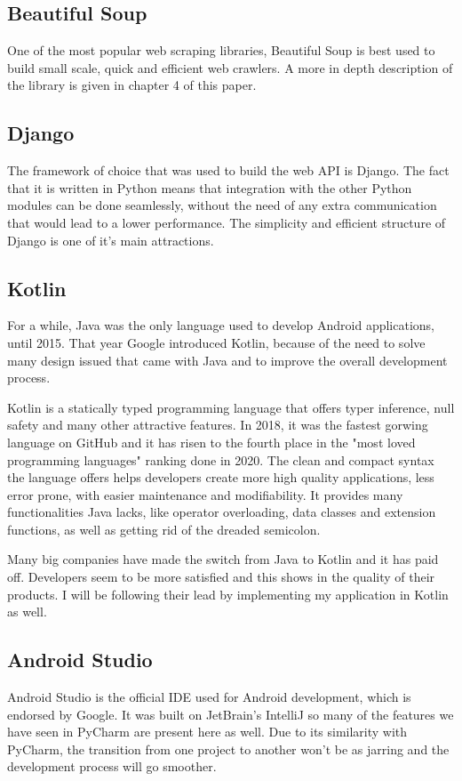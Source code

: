 \documentclass[12pt,a4paper,twoside]{report}
\begin{document}
\subsection{Beautiful Soup} 
One of the most popular web scraping libraries, Beautiful Soup is best used to build small scale, quick and efficient web crawlers. A more in depth description of the library is given in chapter 4 of this paper.

\subsection{Django}
The framework of choice that was used to build the web API is Django. The fact that it is written in Python means that integration with the other Python modules can be done seamlessly, without the need of any extra communication that would lead to a lower performance. The simplicity and efficient structure of Django is one of it's main attractions.

\subsection{Kotlin}
For a while, Java was the only language used to develop Android applications, until 2015. That year Google introduced Kotlin, because of the need to solve many design issued that came with Java and to improve the overall development process.

Kotlin is a statically typed programming language that offers typer inference, null safety and many other attractive features. In 2018, it was the fastest gorwing language on GitHub and it has risen to the fourth place in the "most loved programming languages" ranking done in 2020. The clean and compact syntax the language offers helps developers create more high quality applications, less error prone, with easier maintenance and modifiability. It provides many functionalities Java lacks, like operator overloading, data classes and extension functions, as well as getting rid of the dreaded semicolon.

Many big companies have made the switch from Java to Kotlin and it has paid off. Developers seem to be more satisfied and this shows in the quality of their products. I will be following their lead by implementing my application in Kotlin as well.

\subsection{Android Studio}
Android Studio is the official IDE used for Android development, which is endorsed by Google. It was built on JetBrain's IntelliJ so many of the features we have seen in PyCharm are present here as well. Due to its similarity with PyCharm, the transition from one project to another won't be as jarring and the development process will go smoother. 
\end{document}

